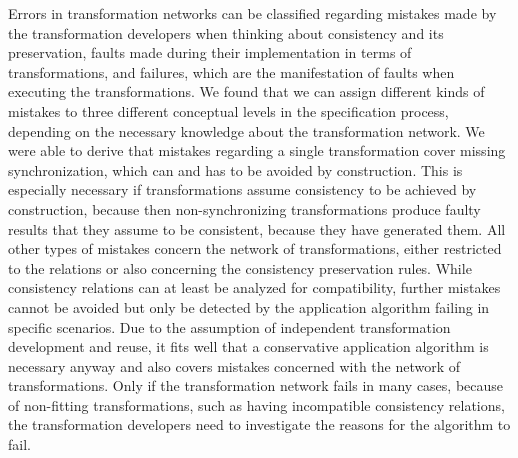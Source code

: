 \begin{insight}[Errors]
    Errors in transformation networks can be classified regarding mistakes made by the transformation developers when thinking about consistency and its preservation, faults made during their implementation in terms of transformations, and failures, which are the manifestation of faults when executing the transformations.
    We found that we can assign different kinds of mistakes to three different conceptual levels in the specification process, depending on the necessary knowledge about the transformation network.
    We were able to derive that mistakes regarding a single transformation cover missing synchronization, which can and has to be avoided by construction.
    This is especially necessary if transformations assume consistency to be achieved by construction, because then non-synchronizing transformations produce faulty results that they assume to be consistent, because they have generated them.
    All other types of mistakes concern the network of transformations, either restricted to the relations or also concerning the consistency preservation rules.
    While consistency relations can at least be analyzed for compatibility, further mistakes cannot be avoided but only be detected by the application algorithm failing in specific scenarios.
    Due to the assumption of independent transformation development and reuse, it fits well that a conservative application algorithm is necessary anyway and also covers mistakes concerned with the network of transformations.
    Only if the transformation network fails in many cases, because of non-fitting transformations, such as having incompatible consistency relations, the transformation developers need to investigate the reasons for the algorithm to fail.
\end{insight}